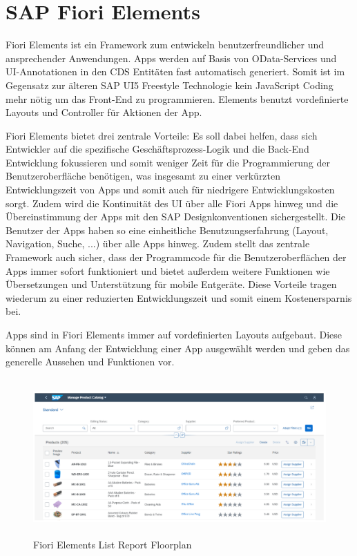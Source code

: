 \section{SAP Fiori Elements}



Fiori Elements ist ein Framework zum entwickeln benutzerfreundlicher und ansprechender Anwendungen. Apps werden auf Basis von OData-Services und UI-Annotationen in den CDS Entitäten fast automatisch generiert. Somit ist im Gegensatz zur älteren SAP UI5 Freestyle Technologie kein JavaScript Coding mehr nötig um das Front-End zu programmieren. Elements benutzt vordefinierte Layouts und Controller für Aktionen der App.

Fiori Elements bietet drei zentrale Vorteile: Es soll dabei helfen, dass sich Entwickler auf die spezifische Geschäftsprozess-Logik und die Back-End Entwicklung fokussieren und somit weniger Zeit für die Programmierung der Benutzeroberfläche benötigen, was insgesamt zu einer verkürzten Entwicklungszeit von Apps und somit auch für niedrigere Entwicklungskosten sorgt. Zudem wird die Kontinuität des UI über alle Fiori Apps hinweg und die Übereinstimmung der Apps mit den SAP Designkonventionen sichergestellt. Die Benutzer der Apps haben so eine einheitliche Benutzungserfahrung (Layout, Navigation, Suche, ...) über alle Apps hinweg. Zudem stellt das zentrale Framework auch sicher, dass der Programmcode für die Benutzeroberflächen der Apps immer sofort funktioniert und bietet au{\ss}erdem weitere Funktionen wie Übersetzungen und Unterstützung für mobile Entgeräte. Diese Vorteile tragen wiederum zu einer reduzierten Entwicklungszeit und somit einem Kostenersparnis bei.

Apps sind in Fiori Elements immer auf vordefinierten Layouts aufgebaut. Diese können am Anfang der Entwicklung einer App ausgewählt werden und geben das generelle Aussehen und Funktionen vor.

\begin{figure}[H]
    \centering
    \includegraphics[height=6cm]{Bilder/Fiori_Elements_List_Floorplan.png}
    \caption[Fiori Elements List Report Floorplan]{Fiori Elements List Report Floorplan}
    \label{fig:iso_norm}
\end{figure}

